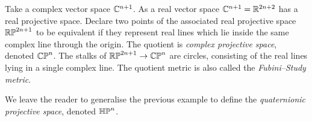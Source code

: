 \begin{example}
Take a complex vector space \(\mathbb{C}^{n+1}\).
As a real vector space \(\mathbb{C}^{n+1}=\mathbb{R}^{2n+2}\) has a real projective space.
Declare two points of the associated real projective space \(\mathbb{RP}^{2n+1}\) to be equivalent if they represent real lines which lie inside the same complex line through the origin.
The quotient is \emph{complex projective space}, denoted \(\mathbb{CP}^{n}\).
The stalks of \(\mathbb{RP}^{2n+1} \to \mathbb{CP}^{n}\) are circles, consisting of the real lines lying in a single complex line.
The quotient metric is also called the \emph{Fubini--Study metric}.
\end{example}
\begin{example}
We leave the reader to generalise the previous example to define the \emph{quaternionic projective space}, denoted \(\mathbb{HP}^{n}\).
\end{example}

